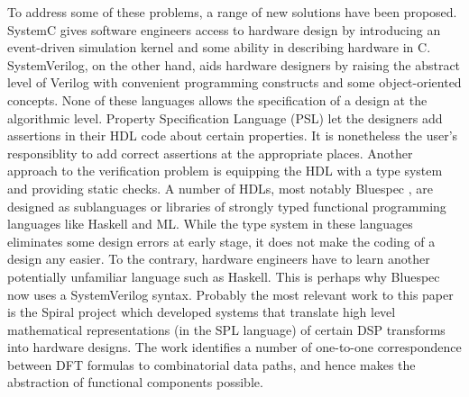 To address some of these problems, a range of new solutions have been
proposed. 
SystemC\cite{Grotker-sysC} gives software engineers access to hardware 
design by 
introducing an event-driven simulation
kernel and some ability in describing hardware in C. 
SystemVerilog\cite{Sutherland-systemverilog}, on the other hand, aids hardware designers by raising 
the abstract level of Verilog with convenient programming constructs and 
some object-oriented concepts. None of these
languages allows the specification of a design at the algorithmic level. 
Property Specification Language (PSL) let the designers 
add assertions in their HDL code about certain properties. 
It is nonetheless the user's responsiblity to add correct assertions
at the appropriate places. Another approach to the verification
problem is equipping the HDL with a type system and providing static checks.
A number of HDLs, most notably Bluespec \cite{Arvind03:bluespec}, 
are designed as sublanguages or 
libraries of strongly typed functional programming languages like Haskell\cite{HaskellBook} and ML\cite{ML:Milner}. 
While the type system in these languages eliminates some design errors at early stage,
it does not make the coding of a design any easier. To the contrary, hardware
engineers have to learn another potentially unfamiliar language such as Haskell.
This is perhaps why Bluespec now uses a SystemVerilog syntax.
Probably the most relevant work to this paper is the Spiral project \cite{NordinMHP05:Spiral}
which developed systems that translate high level mathematical representations 
(in the SPL language) 
of certain DSP transforms into hardware designs. 
The work identifies a number of one-to-one correspondence between DFT formulas to 
combinatorial data paths, and hence makes the abstraction of functional components possible. 



